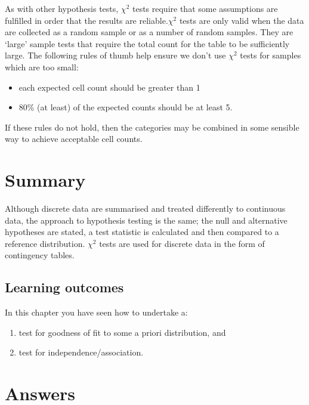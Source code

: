 \documentclass[
  oneside]{krantz}
\providecommand{\tightlist}{%
  \setlength{\itemsep}{0pt}\setlength{\parskip}{0pt}}
\begin{document}
As with other hypothesis tests, \(\chi^2\) tests require that some assumptions are fulfilled in order that the results are reliable.\(\chi^2\) tests are only valid when the data are collected as a random sample or as a number of random samples. They are `large' sample tests that require the total count for the table to be sufficiently large. The following rules of thumb help ensure we don't use \(\chi^2\) tests for samples which are too small:

\begin{itemize}
\tightlist
\item
  each expected cell count should be greater than 1
\item
  80\% (at least) of the expected counts should be at least 5.
\end{itemize}

If these rules do not hold, then the categories may be combined in some sensible way to achieve acceptable cell counts.

\hypertarget{summary}{%
\section{Summary}\label{summary}}

Although discrete data are summarised and treated differently to continuous data, the approach to hypothesis testing is the same; the null and alternative hypotheses are stated, a test statistic is calculated and then compared to a reference distribution. \(\chi^2\) tests are used for discrete data in the form of contingency tables.

\hypertarget{learning-outcomes-7}{%
\subsection{Learning outcomes}\label{learning-outcomes-7}}

In this chapter you have seen how to undertake a:

\begin{enumerate}
\def\labelenumi{\arabic{enumi}.}
\item
  test for goodness of fit to some a priori distribution, and
\item
  test for independence/association.
\end{enumerate}

\hypertarget{answers}{%
\section{Answers}\label{answers}}
\end{document}

